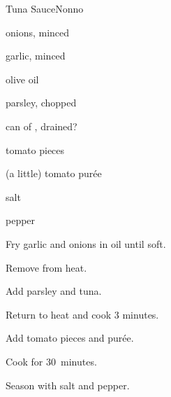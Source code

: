 \begin{recipe}{Tuna Sauce\FIXME}{Nonno}{}

\begin{ingredients}
\item onions, minced
\item garlic, minced
\item olive oil
\item parsley, chopped
\item can of , drained?
\item tomato pieces
\item (a little) tomato pur\'ee
\item salt
\item pepper
\end{ingredients}

\begin{directions}
\item Fry garlic and onions in oil until soft.
\item Remove from heat.
\item Add parsley and tuna.
\item Return to heat and cook 3 minutes.
\item Add tomato pieces and pur\'ee.
\item Cook for 30~minutes.
\item Season with salt and pepper.
\end{directions}

\end{recipe}
